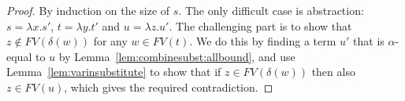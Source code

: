 \documentclass{lmcs}
\theoremstyle{theorem}\newtheorem{theorem}{Theorem}
\theoremstyle{theorem}\newtheorem{lemma}[theorem]{Lemma}
\theoremstyle{theorem}\newtheorem{corollary}[theorem]{Corollary}
\theoremstyle{definition}\newtheorem{definition}[theorem]{Definition}
\theoremstyle{definition}\newtheorem{example}[theorem]{Example}
\newcommand{\FV}{\mathit{FV}}
\newcommand{\domain}{\mathtt{dom}}
\newcommand{\identifier}[1]{\mathtt{#1}}
\newcommand{\afun}{\identifier{f}}
\newcommand{\avar}{x}
\newcommand{\bvar}{y}
\newcommand{\cvar}{z}
\newcommand{\Avar}{X}
\newcommand{\abs}[2]{\lambda #1.#2}
\newcommand{\meta}[2]{#1\langle#2\rangle}
\newcommand{\tuple}[2]{\llparenthesis #1,\dots,#2 \rrparenthesis}
\begin{document}
\begin{proof}
By induction on the size of $s$.  The only difficult case is abstraction:
$s = \abs{\avar}{s'}$, $t = \abs{\bvar}{t'}$ and $u = \abs{\cvar}{u'}$.  The
challenging part is to show that $\cvar \notin \FV(\delta(w))$ for any $w \in
\FV(t)$.  We do this by finding a term $u'$ that is $\alpha$-equal to $u$ by
Lemma~\ref{lem:combinesubst:allbound}, and use Lemma~\ref{lem:varinsubstitute}
to show that if $\cvar \in \FV(\delta(w))$ then also $\cvar \in \FV(u)$, which
gives the required contradiction.

\end{proof}
\end{document}
